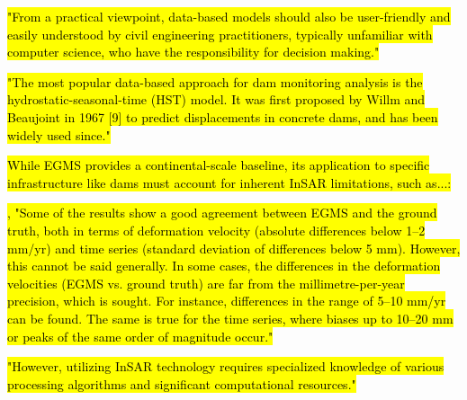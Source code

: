 \documentclass[11pt,a4paper]{article}
\begin{document}
\hl{\mbox{\parencite{salazarAnomalyDetectionDam2021}} "From a practical viewpoint, data-based models should also be user-friendly and easily  understood by civil engineering practitioners, typically unfamiliar with computer science,  who have the responsibility for decision making."}

\hl{\mbox{\parencite{salazar2017}} "The most popular data-based approach for dam monitoring analysis is the hydrostatic-seasonal-time (HST) model. It was first proposed by Willm and Beaujoint in 1967 [9] to predict displacements in concrete dams, and has been widely used since."}

\hl{While EGMS provides a continental-scale baseline, its application to specific infrastructure like dams must account for inherent InSAR limitations, such as...:}

\hl{\mbox{\parencite{crosetto2025}}, "Some of the results show a good agreement between EGMS and the ground truth, both in terms of deformation velocity (absolute differences below 1–2 mm/yr) and time series (standard deviation of differences below 5 mm). However, this cannot be said generally. In some cases, the differences in the deformation velocities (EGMS vs. ground truth) are far from the millimetre-per-year precision, which is sought. For instance, differences in the range of 5–10 mm/yr can be found. The same is true for the time series, where biases up to 10–20 mm or peaks of the same order of magnitude occur."}

\hl{\mbox{\parencite{ruiz-armenteros2023}} "However, utilizing InSAR technology requires specialized knowledge of various processing algorithms and significant computational resources."}




\end{document}
